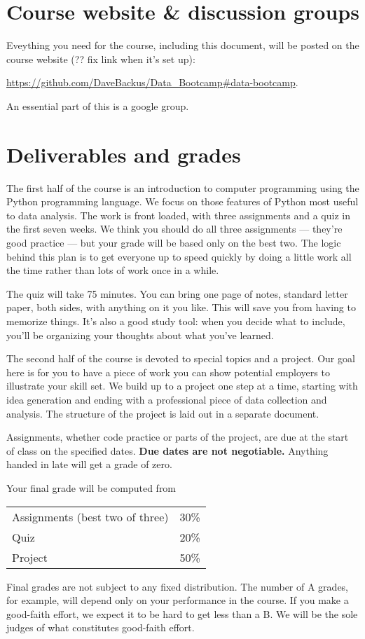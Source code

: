 \documentclass[11pt]{article}
\begin{document}
\section*{Course website \& discussion groups}

Eveything you need for the course, including this document, will be posted on
the course website (?? fix link when it's set up):
%
\vspace{-0.2in}
\begin{center}
\url{https://github.com/DaveBackus/Data_Bootcamp#data-bootcamp}.
\end{center}
\vspace{-0.2in}
%
An essential part of this is a google group.


\section*{Deliverables and grades}

The first half of the course is an introduction to computer programming
using the Python programming language.
We focus on those features of Python most useful to data analysis.
The work is front loaded, with three assignments and a quiz
in the first seven weeks.
We think you should do all three assignments --- they're good practice ---
but your grade will be based only on the best two.
The logic behind this plan is to get everyone up to speed quickly
by doing a little work all the time rather than lots of work once in a while.

The quiz will take 75 minutes.
You can bring one page of notes, standard letter paper,
both sides, with anything on it you like.
This will save you from having to memorize things.
It's also a good study tool:  when you decide what to include,
you'll be organizing your thoughts about what you've learned.


The second half of the course is devoted to special topics and a project.
Our goal here is for you to have a piece of work you can show potential employers
to illustrate your skill set.
We build up to a project one step at a time, starting with idea generation and ending
with a professional piece of data collection and analysis.
The structure of the project is laid out in a separate document.

Assignments, whether code practice or parts of the project,
are due at the start of class on the specified dates.
{\bf Due dates are not negotiable.\/}
Anything handed in late will get a grade of zero.

Your final grade will be computed from
\begin{center}
\begin{tabular}{ll}
Assignments (best two of three) & 30\% \\
Quiz        & 20\% \\
Project     & 50\% \\
\end{tabular}
\end{center}
Final grades are not subject to any fixed distribution.
The number of A grades, for example,
will depend only on your performance in the course.
If you make a good-faith effort,
we expect it to be hard to get less than a B.
We will be the sole judges of what constitutes good-faith effort.
\end{document}

